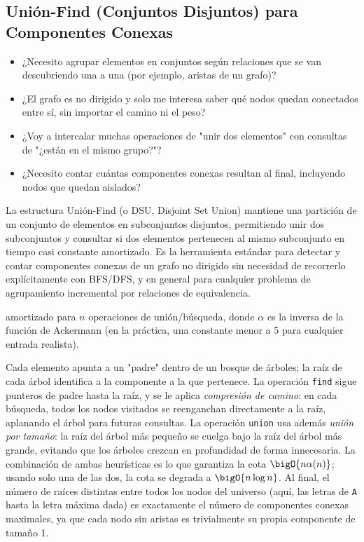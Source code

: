 \subsection{Unión-Find (Conjuntos Disjuntos) para Componentes Conexas}


\begin{itemize}
\item ¿Necesito agrupar elementos en conjuntos según relaciones que se van descubriendo una a una (por ejemplo, aristas de un grafo)?
\item ¿El grafo es no dirigido y solo me interesa saber qué nodos quedan conectados entre sí, sin importar el camino ni el peso?
\item ¿Voy a intercalar muchas operaciones de "unir dos elementos" con consultas de "¿están en el mismo grupo?"?
\item ¿Necesito contar cuántas componentes conexas resultan al final, incluyendo nodos que quedan aislados?
\end{itemize}

 La estructura Unión-Find (o DSU, Disjoint Set Union) mantiene una partición de un conjunto de elementos en subconjuntos disjuntos, permitiendo unir dos subconjuntos y consultar si dos elementos pertenecen al mismo subconjunto en tiempo casi constante amortizado. Es la herramienta estándar para detectar y contar componentes conexas de un grafo no dirigido sin necesidad de recorrerlo explícitamente con BFS/DFS, y en general para cualquier problema de agrupamiento incremental por relaciones de equivalencia.

  amortizado para $n$ operaciones de unión/búsqueda, donde $\alpha$ es la inversa de la función de Ackermann (en la práctica, una constante menor a 5 para cualquier entrada realista).

 Cada elemento apunta a un "padre" dentro de un bosque de árboles; la raíz de cada árbol identifica a la componente a la que pertenece. La operación \texttt{find} sigue punteros de padre hasta la raíz, y se le aplica \emph{compresión de camino}: en cada búsqueda, todos los nodos visitados se reenganchan directamente a la raíz, aplanando el árbol para futuras consultas. La operación \texttt{union} usa además \emph{unión por tamaño}: la raíz del árbol más pequeño se cuelga bajo la raíz del árbol más grande, evitando que los árboles crezcan en profundidad de forma innecesaria. La combinación de ambas heurísticas es lo que garantiza la cota $\bigO{n \alpha(n)}$; usando solo una de las dos, la cota se degrada a $\bigO{n \log n}$. Al final, el número de raíces distintas entre todos los nodos del universo (aquí, las letras de \texttt{A} hasta la letra máxima dada) es exactamente el número de componentes conexas maximales, ya que cada nodo sin aristas es trivialmente su propia componente de tamaño 1.

